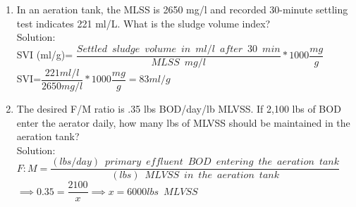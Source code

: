 \begin{enumerate}
\item In an aeration tank, the MLSS is 2650 mg/l and recorded 30-minute settling test indicates 221 ml/L.  What is the sludge volume index?\\
\vspace{0.3cm}
Solution:\\
SVI (ml/g)= $\dfrac{Settled \enspace sludge \enspace volume \enspace in \enspace ml/l \enspace after \enspace 30 \enspace min}{MLSS \enspace mg/l}*1000 \dfrac{mg}{g}$\\
\vspace{0.5cm}
SVI=$\dfrac{221ml/l}{2650mg/l}*1000\dfrac{mg}{g}=\boxed{83ml/g}$
\item The desired F/M ratio is .35 lbs BOD/day/lb MLVSS. If 2,100 lbs of BOD enter the aerator daily, how many lbs of MLVSS should be maintained in the aeration tank?\\
Solution:\\
$F:M=\dfrac{(lbs/day) \enspace primary \enspace effluent  \enspace BOD \enspace entering \enspace the  \enspace aeration \enspace tank}{(lbs) \enspace MLVSS \enspace in \enspace the  \enspace aeration \enspace tank}$\\
\vspace{0.3cm}
$\implies 0.35=\dfrac{2100}{x}\implies x = \boxed{6000lbs \enspace MLVSS}$\\

\end{enumerate}


